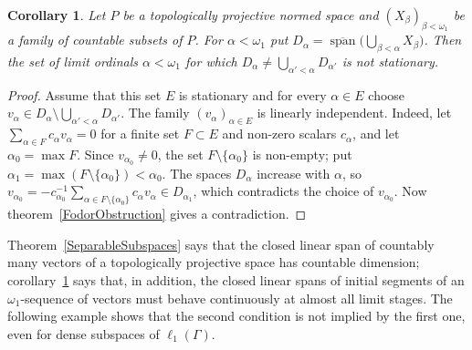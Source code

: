 \documentclass[12pt]{article}
\newtheorem{corollary}[theorem]{Corollary}
\newcommand{\ellone}[1]{\ell_1(#1)}
\newcommand{\Lin}{\operatorname{span}}
\begin{document}
\begin{corollary}\label{OmegaOneContinuity} Let $P$ be a topologically
    projective normed space and ${(X_\beta)}_{\beta<\omega_1}$ be a family of
    countable subsets of $P$. For $\alpha<\omega_1$ put
    $D_\alpha=\overline{\Lin}\bigl(\bigcup_{\beta<\alpha}X_\beta\bigr)$. Then
    the set of limit ordinals $\alpha<\omega_1$ for which
    $D_\alpha\neq\bigcup_{\alpha'<\alpha}D_{\alpha'}$ is not stationary.
\end{corollary}
\begin{proof} Assume that this set $E$ is stationary and for every
    $\alpha\in E$ choose $v_\alpha\in D_\alpha\setminus\bigcup_{\alpha'<\alpha}D_{\alpha'}$.
    The family ${(v_\alpha)}_{\alpha\in E}$ is linearly independent. Indeed,
    let $\sum_{\alpha\in F}c_\alpha v_\alpha=0$ for a finite set $F\subset E$
    and non-zero scalars $c_\alpha$, and let $\alpha_0=\max F$. Since
    $v_{\alpha_0}\neq 0$, the set $F\setminus\{\alpha_0\}$ is non-empty; put
    $\alpha_1=\max(F\setminus\{\alpha_0\})<\alpha_0$. The spaces $D_\alpha$
    increase with $\alpha$, so
    $v_{\alpha_0}=-c_{\alpha_0}^{-1}\sum_{\alpha\in F\setminus\{\alpha_0\}}c_\alpha v_\alpha
    \in D_{\alpha_1}$, which contradicts the choice of $v_{\alpha_0}$. Now
    theorem~\ref{FodorObstruction} gives a contradiction.
\end{proof}

Theorem~\ref{SeparableSubspaces} says that the closed linear span of
countably many vectors of a topologically projective space has countable
dimension; corollary~\ref{OmegaOneContinuity} says that, in addition, the
closed linear spans of initial segments of an $\omega_1$-sequence of vectors
must behave continuously at almost all limit stages. The following example
shows that the second condition is not implied by the first one, even for
dense subspaces of $\ellone{\Gamma}$.
\end{document}
